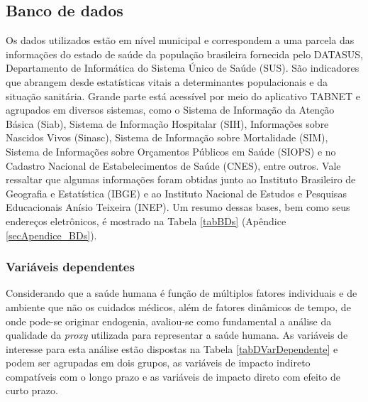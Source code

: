 \documentclass[twoside,onecolumn,12pt]{article}
\numberwithin{outputctr}{section}
\begin{document}

\subsection{Banco de dados}

Os dados utilizados est\~{a}o em n\'{i}vel municipal e correspondem a uma parcela das informa\c{c}\~{o}es do estado de sa\'{u}de da popula\c{c}\~{a}o brasileira fornecida pelo DATASUS, Departamento de Inform\'{a}tica do Sistema \'{U}nico de Sa\'{u}de (SUS). S\~{a}o indicadores que abrangem desde estat\'{i}sticas vitais a determinantes populacionais e da situa\c{c}\~{a}o sanit\'{a}ria. Grande parte est\'{a} acess\'{i}vel por meio do aplicativo TABNET e agrupados em diversos sistemas, como o Sistema de Informa\c{c}\~{a}o da Aten\c{c}\~{a}o B\'{a}sica (Siab), Sistema de Informa\c{c}\~{a}o Hospitalar (SIH), Informa\c{c}\~{o}es sobre Nascidos Vivos (Sinasc), Sistema de Informa\c{c}\~{a}o sobre Mortalidade (SIM), Sistema de Informa\c{c}\~{o}es sobre Or\c{c}amentos P\'{u}blicos em Sa\'{u}de (SIOPS) e  no Cadastro Nacional de Estabelecimentos de Sa\'{u}de (CNES), entre outros. Vale ressaltar que algumas informa\c{c}\~{o}es foram obtidas junto ao Instituto Brasileiro de Geografia e Estat\'{i}stica (IBGE) e ao Instituto Nacional de Estudos e Pesquisas Educacionais An\'{i}sio Teixeira (INEP). Um resumo dessas bases, bem como seus endere\c{c}os eletr\^{o}nicos, \'{e} mostrado na Tabela \ref{tabBDs} (Ap\^{e}ndice \ref{secApendice_BDs}).

\subsubsection{Vari\'{a}veis dependentes}

Considerando que a sa\'{u}de humana \'{e} fun\c{c}\~{a}o de m\'{u}ltiplos fatores individuais e de ambiente que n\~{a}o os cuidados m\'{e}dicos, al\'{e}m de fatores din\^{a}micos de tempo, de onde pode-se originar endogenia, avaliou-se como fundamental a an\'{a}lise da qualidade da \textit{proxy} utilizada para representar a sa\'{u}de humana. As vari\'{a}veis de interesse para esta an\'{a}lise est\~{a}o dispostas na Tabela \ref{tabDVarDependente} e podem ser agrupadas em dois grupos, as vari\'{a}veis de impacto indireto compat\'{i}veis com o longo prazo e as vari\'{a}veis de impacto direto com efeito de curto prazo.
\end{document}
